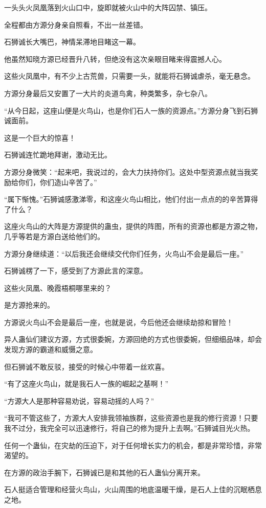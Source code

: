 \begin{this_body}
一头头火凤凰落到火山口中，旋即就被火山中的大阵囚禁、镇压。

全程都由方源分身亲自照看，不出一丝差错。

石狮诚长大嘴巴，神情呆滞地目睹这一幕。

他虽然知晓方源已经晋升八转，但绝没有这次亲眼目睹来得震撼人心。

这些火凤凰中，有不少上古荒兽，只需要一头，就能将石狮诚虐杀，毫无悬念。

方源分身最后又安置了一大片的炎道鸟禽，种类繁多，杂七杂八。

“从今日起，这座山便是火鸟山，也是你们石人一族的资源点。”方源分身飞到石狮诚面前。

这是一个巨大的惊喜！

石狮诚连忙跪地拜谢，激动无比。

方源分身微笑：“起来吧，我说过的，会大力扶持你们。这处中型资源点就当我奖励给你们，你们造山辛苦了。”

“属下惭愧。”石狮诚感激涕零，和这座火鸟山相比，他们付出一点点的的辛苦算得了什么？

这座火鸟山的大阵是方源提供的蛊虫，提供的阵图，所有的资源也都是方源之物，几乎等若是方源白送给他们的。

方源分身继续道：“以后我还会继续交代你们任务，火鸟山不会是最后一座。”

石狮诚楞了一下，感受到了方源此言的深意。

这些火凤凰、晚霞梧桐哪里来的？

是方源抢来的。

方源说火鸟山不会是最后一座，也就是说，今后他还会继续劫掠和冒险！

异人蛊仙们建议方源，方式很委婉，方源回绝的方式也很委婉，但细细品味，却会发现方源的霸道和威慑之意。

但石狮诚不敢反驳，接受的时候心中带着一丝欢喜。

“有了这座火鸟山，就是我石人一族的崛起之基啊！”

“方源大人是那种容易劝说，容易动摇的人吗？”

“我可不管这些了，方源大人安排我领袖族群，这些资源也是我的修行资源！只要我不过分，我完全可以迅速修行，将自己的修为提升上去啊。”石狮诚目光火热。

任何一个蛊仙，在灾劫的压迫下，对于任何增长实力的机会，都是非常珍惜，非常渴望的。

在方源的政治手腕下，石狮诚已是和其他的石人蛊仙分离开来。

石人挺适合管理和经营火鸟山，火山周围的地底温暖干燥，是石人上佳的沉眠栖息之地。


\end{this_body}

